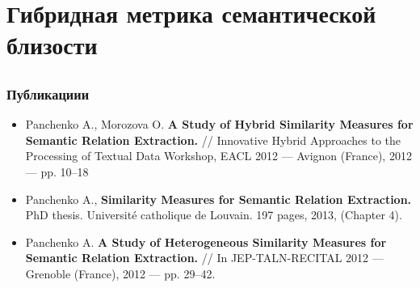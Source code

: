 \documentclass{beamer}
\begin{document}
\section[HybridSim]{Гибридная метрика семантической близости}

\subsection{}

\begin{frame}
\frametitle{Публикациии}
\begin{itemize}
\item Panchenko A., Morozova O. \textbf{A Study of Hybrid Similarity Measures
for Semantic Relation Extraction.} // Innovative Hybrid Approaches to the Processing of Textual Data Workshop, EACL 2012 — Avignon (France), 2012 — pp. 10–18 
\item Panchenko A., \textbf{Similarity Measures for Semantic Relation
Extraction.} PhD thesis. Universit\'{e} catholique de Louvain. 197
pages, 2013, (Chapter 4). 

\item Panchenko A. \textbf{A Study of Heterogeneous Similarity Measures for
Semantic Relation Extraction.} // In JEP-TALN-RECITAL 2012 — Grenoble (France), 2012 — pp. 29–42.
\end{itemize}
\end{frame}




\end{document}

